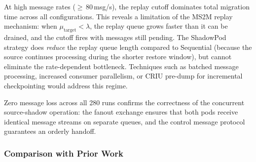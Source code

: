 \documentclass[conference]{IEEEtran}
\begin{document}
At high message rates ($\geq$\,80\,msg/s), the replay cutoff dominates total
migration time across all configurations. This reveals a limitation of
the MS2M replay mechanism: when $\mu_{\text{target}} < \lambda$, the replay
queue grows faster than it can be drained, and the cutoff fires with messages
still pending. The ShadowPod strategy does \textit{reduce} the replay
queue length compared to Sequential (because the source continues processing
during the shorter restore window), but cannot eliminate the rate-dependent
bottleneck. Techniques such as batched message processing, increased consumer
parallelism, or CRIU pre-dump for incremental checkpointing would address this
regime.

Zero message loss across all 280 runs confirms the correctness of the
concurrent source-shadow operation: the fanout exchange ensures that both
pods receive identical message streams on separate queues, and the control
message protocol guarantees an orderly handoff.

\subsubsection{Comparison with Prior Work}
\end{document}
